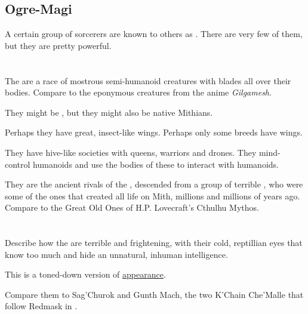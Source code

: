 \subsection{Ogre-Magi}
A certain group of \nephilic{} sorcerers are known to others as . There are very few of them, but they are pretty powerful.














\section{\NerasKirishgaith}
\label{\NerasKirishgaith}
The \NerasKirishgaith{} are a race of mostrous semi-humanoid creatures with blades all over their bodies. Compare to the eponymous creatures from the anime \emph{Gilgamesh}. 

They might be \banes, but they might also be native Mithians. 

Perhaps they have great, insect-like wings. Perhaps only some breeds have wings. 

They have hive-like societies with queens, warriors and drones. They mind-control humanoids and use the bodies of these to interact with humanoids. 

They are the ancient rivals of the \ophidians, descended from a group of terrible , who were some of the ones that created all life on Mith, millions and millions of years ago. Compare to the Great Old Ones of H.P. Lovecraft's Cthulhu Mythos.















\section{\Nycans}
\label{Nycans are frightening}
Describe how the \nycans{} are terrible and frightening, with their cold, reptillian eyes that know too much and hide an unnatural, inhuman intelligence. 

This is a toned-down version of \hyperref[Draconic appearance]{\draconic{} appearance}. 

Compare them to Sag'Churok and Gunth Mach, the two K'Chain Che'Malle that follow Redmask in \MalazanReapersGale.

















